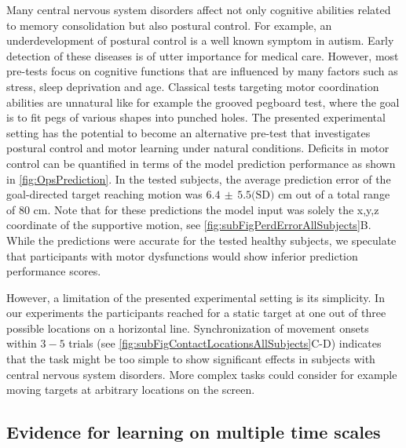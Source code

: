 Many central nervous system disorders affect not only cognitive abilities 
related to memory consolidation but also postural control.  For example, an 
underdevelopment of postural control is a well known symptom in 
autism\cite{schmitz2003motor, minshew2004underdevelopment}. Early detection of 
these diseases is of utter importance for medical care. However, most pre-tests 
focus on cognitive functions that are influenced by many factors such as stress, 
sleep deprivation and age. Classical tests targeting motor coordination 
abilities are unnatural like for example the grooved pegboard 
test\cite{klove1963clinical}, where the goal is to fit pegs of various shapes 
into punched holes. The presented experimental setting has the 
potential to become an alternative pre-test that investigates postural control 
and motor learning under natural conditions. Deficits in motor control can be 
quantified in terms of the model prediction performance as shown in \FigureAbbr 
\ref{fig:OpsPrediction}. In the tested subjects, the average prediction error of the 
goal-directed target reaching motion was $6.4 \, \pm \, 5.5 \textrm{(SD)}$ cm out of a total range of 
$80$ cm. Note that for these predictions the model input was solely the x,y,z coordinate of 
the supportive motion, see \FigureAbbr \ref{fig:subFigPerdErrorAllSubjects}B. 
While the predictions were accurate for the tested healthy subjects, we speculate that 
participants with motor dysfunctions would show inferior prediction performance scores. 

However, a limitation of the presented experimental setting is its simplicity. 
In our experiments the participants reached for a static target at one out of three possible locations  
on a horizontal line. Synchronization of movement onsets within $3-5$ trials (see \FigureAbbr \ref{fig:subFigContactLocationsAllSubjects}C-D) 
indicates that the task might be too simple to show significant effects in subjects 
with central nervous system disorders. More complex tasks could consider for example moving 
targets at arbitrary locations on the screen. 

\subsection{Evidence for learning on multiple time scales}

